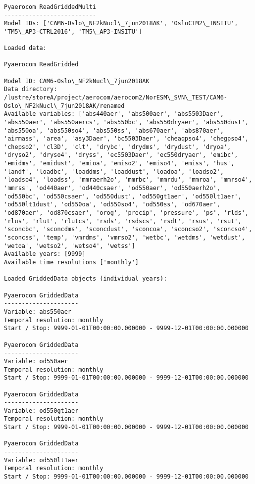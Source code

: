 \documentclass[11pt]{article}
\begin{document}
    \begin{Verbatim}[commandchars=\\\{\}]

Pyaerocom ReadGriddedMulti
--------------------------
Model IDs: ['CAM6-Oslo\_NF2kNucl\_7jun2018AK', 'OsloCTM2\_INSITU', 'TM5\_AP3-CTRL2016', 'TM5\_AP3-INSITU']

Loaded data:

Pyaerocom ReadGridded
---------------------
Model ID: CAM6-Oslo\_NF2kNucl\_7jun2018AK
Data directory: /lustre/storeA/project/aerocom/aerocom2/NorESM\_SVN\_TEST/CAM6-Oslo\_NF2kNucl\_7jun2018AK/renamed
Available variables: ['abs440aer', 'abs500aer', 'abs5503Daer', 'abs550aer', 'abs550aercs', 'abs550bc', 'abs550dryaer', 'abs550dust', 'abs550oa', 'abs550so4', 'abs550ss', 'abs670aer', 'abs870aer', 'airmass', 'area', 'asy3Daer', 'bc5503Daer', 'cheaqpso4', 'chegpso4', 'chepso2', 'cl3D', 'clt', 'drybc', 'drydms', 'drydust', 'dryoa', 'dryso2', 'dryso4', 'dryss', 'ec5503Daer', 'ec550dryaer', 'emibc', 'emidms', 'emidust', 'emioa', 'emiso2', 'emiso4', 'emiss', 'hus', 'landf', 'loadbc', 'loaddms', 'loaddust', 'loadoa', 'loadso2', 'loadso4', 'loadss', 'mmraerh2o', 'mmrbc', 'mmrdu', 'mmroa', 'mmrso4', 'mmrss', 'od440aer', 'od440csaer', 'od550aer', 'od550aerh2o', 'od550bc', 'od550csaer', 'od550dust', 'od550gt1aer', 'od550lt1aer', 'od550lt1dust', 'od550oa', 'od550so4', 'od550ss', 'od670aer', 'od870aer', 'od870csaer', 'orog', 'precip', 'pressure', 'ps', 'rlds', 'rlus', 'rlut', 'rlutcs', 'rsds', 'rsdscs', 'rsdt', 'rsus', 'rsut', 'sconcbc', 'sconcdms', 'sconcdust', 'sconcoa', 'sconcso2', 'sconcso4', 'sconcss', 'temp', 'vmrdms', 'vmrso2', 'wetbc', 'wetdms', 'wetdust', 'wetoa', 'wetso2', 'wetso4', 'wetss']
Available years: [9999]
Available time resolutions ['monthly']

Loaded GriddedData objects (individual years):

Pyaerocom GriddedData
---------------------
Variable: abs550aer
Temporal resolution: monthly
Start / Stop: 9999-01-01T00:00:00.000000 - 9999-12-01T00:00:00.000000

Pyaerocom GriddedData
---------------------
Variable: od550aer
Temporal resolution: monthly
Start / Stop: 9999-01-01T00:00:00.000000 - 9999-12-01T00:00:00.000000

Pyaerocom GriddedData
---------------------
Variable: od550gt1aer
Temporal resolution: monthly
Start / Stop: 9999-01-01T00:00:00.000000 - 9999-12-01T00:00:00.000000

Pyaerocom GriddedData
---------------------
Variable: od550lt1aer
Temporal resolution: monthly
Start / Stop: 9999-01-01T00:00:00.000000 - 9999-12-01T00:00:00.000000


\end{Verbatim}
\end{document}
